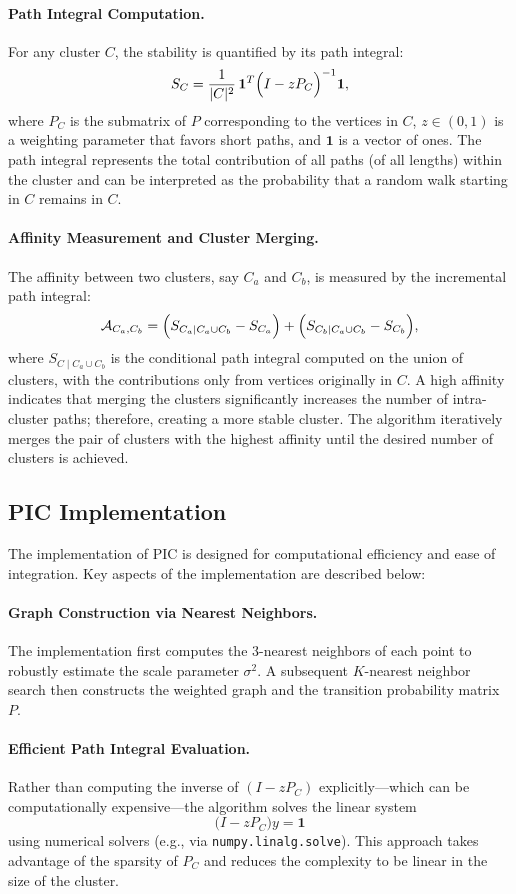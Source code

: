\paragraph{Path Integral Computation.}  
For any cluster $C$, the stability is quantified by its path integral:
\[
S_C = \frac{1}{|C|^2} \, \mathbf{1}^T \Bigl(I - zP_C\Bigr)^{-1} \mathbf{1},
\]
where $P_C$ is the submatrix of $P$ corresponding to the vertices in $C$, $z\in(0,1)$ is a weighting parameter that favors short paths, and $\mathbf{1}$ is a vector of ones. The path integral represents the total contribution of all paths (of all lengths) within the cluster and can be interpreted as the probability that a random walk starting in $C$ remains in $C$.

\paragraph{Affinity Measurement and Cluster Merging.}  
The affinity between two clusters, say $C_a$ and $C_b$, is measured by the incremental path integral:
\[
\mathcal{A}_{C_a, C_b} = \Bigl(S_{C_a \mid C_a\cup C_b} - S_{C_a}\Bigr) + \Bigl(S_{C_b \mid C_a\cup C_b} - S_{C_b}\Bigr),
\]
where $S_{C \mid C_a\cup C_b}$ is the conditional path integral computed on the union of clusters, with the contributions only from vertices originally in $C$. A high affinity indicates that merging the clusters significantly increases the number of intra-cluster paths; therefore, creating a more stable cluster. The algorithm iteratively merges the pair of clusters with the highest affinity until the desired number of clusters is achieved.

\subsection{PIC Implementation}
The implementation of PIC is designed for computational efficiency and ease of integration. Key aspects of the implementation are described below:

\paragraph{Graph Construction via Nearest Neighbors.}  
The implementation first computes the 3-nearest neighbors of each point to robustly estimate the scale parameter $\sigma^2$. A subsequent $K$-nearest neighbor search then constructs the weighted graph and the transition probability matrix $P$.

\paragraph{Efficient Path Integral Evaluation.}  
Rather than computing the inverse of $(I - zP_C)$ explicitly—which can be computationally expensive—the algorithm solves the linear system
\[
\bigl(I - zP_C\bigr) y = \mathbf{1}
\]
using numerical solvers (e.g., via \texttt{numpy.linalg.solve}). This approach takes advantage of the sparsity of $P_C$ and reduces the complexity to be linear in the size of the cluster.

